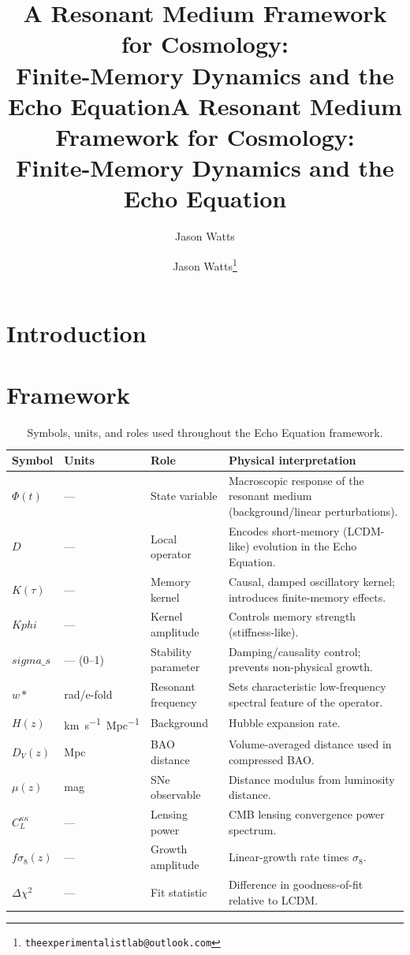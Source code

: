 \documentclass[a4paper,11pt]{article}
\title{A Resonant Medium Framework for Cosmology:\\ Finite-Memory Dynamics and the Echo Equation}
\author{Jason Watts}
\affiliation{Independent Researcher}
\title{A Resonant Medium Framework for Cosmology:\\ Finite-Memory Dynamics and the Echo Equation}
\author[1]{Jason Watts\thanks{\texttt{theexperimentalistlab@outlook.com}}}
\affil[1]{Independent Researcher}
\providecommand{\softness}{\sigma_{\!\mathrm{s}}}
\providecommand{\Kphi}{K_{\!\varphi}}
\providecommand{\wstar}{\omega_\ast}
\providecommand{\LCDM}{\ensuremath{\Lambda\mathrm{CDM}}}
\providecommand{\fsig}{\ensuremath{f\sigma_8}}
\def\LCDM{LCDM}%
\def\wstar{w*}%
\def\Kphi{Kphi}%
\def\softness{sigma\_s}%
\def\Lambda{Lambda}%
\begin{document}
\maketitle

\section{Introduction}\label{sec:introduction}
\clearpage

\section{Framework}\label{sec:framework}

\begin{table}[t]
  \centering
  \caption{Symbols, units, and roles used throughout the Echo Equation framework.}
  \label{tab:symbols}
  \begin{tabular}{@{} l l l p{7.6cm} @{}} \toprule
    \textbf{Symbol} & \textbf{Units} & \textbf{Role} & \textbf{Physical interpretation} \\
    \midrule
    $\Phi(t)$ & — & State variable & Macroscopic response of the resonant medium (background/linear perturbations). \\
    $D$ & — & Local operator & Encodes short-memory (\LCDM-like) evolution in the Echo Equation. \\
    $K(\tau)$ & — & Memory kernel & Causal, damped oscillatory kernel; introduces finite-memory effects. \\
    $\Kphi$ & — & Kernel amplitude & Controls memory strength (stiffness-like). \\
    $\softness$ & — (0–1) & Stability parameter & Damping/causality control; prevents non-physical growth. \\
    $\wstar$ & rad/e-fold & Resonant frequency & Sets characteristic low-frequency spectral feature of the operator. \\
    $H(z)$ & \si{km.s^{-1}.Mpc^{-1}} & Background & Hubble expansion rate. \\
    $D_{V}(z)$ & \si{Mpc} & BAO distance & Volume-averaged distance used in compressed BAO. \\
    $\mu(z)$ & mag & SNe observable & Distance modulus from luminosity distance. \\
    $C_{L}^{\kappa\kappa}$ & — & Lensing power & CMB lensing convergence power spectrum. \\
    $\fsig(z)$ & — & Growth amplitude & Linear-growth rate times $\sigma_{8}$. \\
    $\Delta\chi^{2}$ & — & Fit statistic & Difference in goodness-of-fit relative to \LCDM. \\
  \bottomrule
  \end{tabular}
\end{table}
\end{document}
